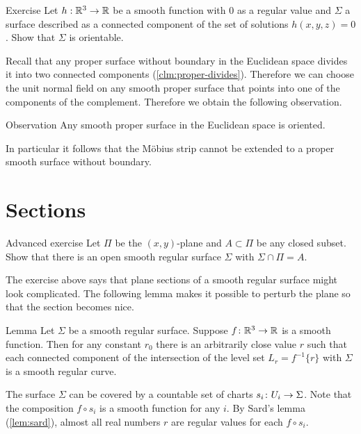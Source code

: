 \begin{thm}{Exercise}\label{ex:implicit-orientable}
Let $h:\mathbb{R}^3\to\mathbb{R}$ be a smooth function with $0$ as a regular value and $\Sigma$ a surface described as a connected component of the set of solutions $h(x,y,z)=0$.
Show that $\Sigma$ is orientable.
\end{thm}

Recall that any proper surface without boundary in the Euclidean space divides it into two connected components (\ref{clm:proper-divides}).
Therefore we can choose the unit normal field on any smooth proper surface that points into one of the components of the complement.
Therefore we obtain the following observation. 

\begin{thm}{Observation}
Any smooth proper surface in the Euclidean space is oriented.
\end{thm}

In particular it follows that the M\"obius strip cannot be extended to a proper smooth surface without boundary.

\section{Sections}

\begin{thm}{Advanced exercise}\label{ex:plane-section}
Let $\Pi$ be the $(x,y)$-plane and $A \subset \Pi$ be any closed subset. Show that there is an open smooth regular surface $\Sigma$ with $\Sigma \cap \Pi = A$.
\end{thm}

The exercise above says that plane sections of a smooth regular surface might look complicated.
The following lemma makes it possible to perturb the plane so that the section becomes nice.

\begin{thm}{Lemma}\label{lem:reg-section}
Let $\Sigma$ be a smooth regular surface.
Suppose $f\:\RR^3\z\to\RR$ is a smooth function.
Then for any constant $r_0$ there is an arbitrarily close value $r$ such that 
each connected component of the intersection of the level set $L_{r}=f^{-1}\{r\}$ with
$\Sigma$ is a smooth regular curve.
\end{thm}

The surface $\Sigma$ can be covered by a countable set of charts $s_i\:U_i\z\to \Sigma$.
Note that the composition $f\circ s_i$ is a smooth function for any $i$.
By Sard's lemma (\ref{lem:sard}), almost all real numbers $r$ are regular values for each $f\circ s_i$.

